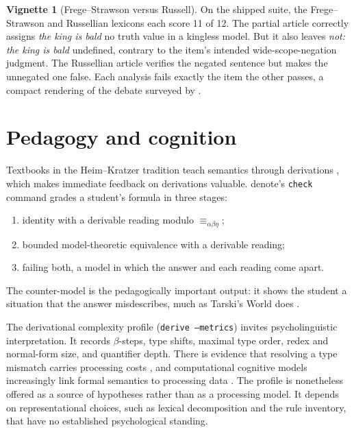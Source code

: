 \documentclass[11pt,a4paper]{article}
\newcommand{\dn}{\textsf{denote}}
\theoremstyle{definition}
\newtheorem{vignette}{Vignette}
\begin{document}
\begin{vignette}[Frege--Strawson versus Russell]\label{v:suite}
On the shipped suite, the Frege--Strawson and Russellian lexicons each score 11 of 12. The partial article correctly assigns \textit{the king is bald} no truth value in a kingless model. But it also leaves \textit{not: the king is bald} undefined, contrary to the item's intended wide-scope-negation judgment. The Russellian article verifies the negated sentence but makes the unnegated one false. Each analysis fails exactly the item the other passes, a compact rendering of the debate surveyed by \citet{vonfintel2004}.
\end{vignette}

\section{Pedagogy and cognition}\label{sec:pedagogy}

Textbooks in the Heim--Kratzer tradition teach semantics through derivations \citep{heimkratzer1998,chierchiamcg2000,jacobson2014,winter2016,coppockchampollion2024}, which makes immediate feedback on derivations valuable. \dn{}'s \texttt{check} command grades a student's formula in three stages:
\begin{enumerate}[1.]
\item identity with a derivable reading modulo $\equiv_{\alpha\beta\eta}$;
\item bounded model-theoretic equivalence with a derivable reading;
\item failing both, a model in which the answer and each reading come apart.
\end{enumerate}
The counter-model is the pedagogically important output: it shows the student a situation that the answer misdescribes, much as Tarski's World does \citep{barkerplummeretal2011}.

The derivational complexity profile (\texttt{derive --metrics}) invites psycholinguistic interpretation. It records $\beta$-steps, type shifts, maximal type order, redex and normal-form size, and quantifier depth. There is evidence that resolving a type mismatch carries processing costs \citep{mcelreeetal2001,pylkkanenmcelree2006}, and computational cognitive models increasingly link formal semantics to processing data \citep{brasoveanudotlacil2020}. The profile is nonetheless offered as a source of hypotheses rather than as a processing model. It depends on representational choices, such as lexical decomposition and the rule inventory, that have no established psychological standing.
\end{document}
